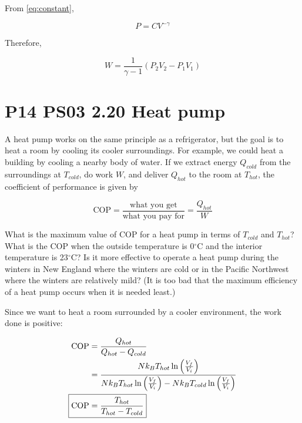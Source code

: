 \documentclass[9pt,a4paper,twocolumn]{article}
\begin{document}
\begin{enumerate}[(a)]
From \eqref{eq:constant},

\begin{equation}
	P = CV^{-\gamma}
\end{equation}

Therefore,

\begin{equation}\label{eq:answer2}
\boxed{	W = \frac{1}{\gamma - 1} \left( P_2 V_2 - P_1 V_1 \right) }
\end{equation}

\end{enumerate}

\section{P14 PS03 2.20 Heat pump}
A heat pump works on the same principle as a refrigerator, but the goal is to heat a room by cooling its cooler surroundings. For example, we could heat a building by cooling a nearby body of water. If we extract energy $Q_{cold}$ from the surroundings at $T_{cold}$, do work $W$, and deliver $Q_{hot}$ to the room at $T_{hot}$, the coefficient of performance is given by

\begin{equation}
	\textrm{COP} = \frac{\textrm{what you get}}{\textrm{what you pay for}} = \frac{Q_{hot}}{W}
\end{equation}

What is the maximum value of COP for a heat pump in terms of $T_{cold}$ and $T_{hot}$? What is the COP when the outside temperature is 0$^\circ$C and the interior temperature is 23$^\circ$C? Is it more effective to operate a heat pump during the winters in New England where the winters are cold or in the Pacific Northwest where the winters are relatively mild? (It is too bad that the maximum efficiency of a heat pump occurs when it is needed least.)

Since we want to heat a room surrounded by a cooler environment, the work done is positive:

\begin{align}
	\textrm{COP} &= \frac{Q_{hot}}{Q_{hot} - Q_{cold}} \\
	&= \frac{N k_B T_{hot} \ln{\left( \frac{V_f}{V_i} \right)}}{Nk_B T_{hot}\ln{\left( \frac{V_f}{V_i} \right)} - Nk_B T_{cold} \ln{\left( \frac{V_f}{V_i} \right)}} \nonumber  \\
	\Aboxed{\textrm{COP} &= \frac{T_{hot}}{T_{hot} - T_{cold}}} \label{eq:answer1}
\end{align}
\end{document}
